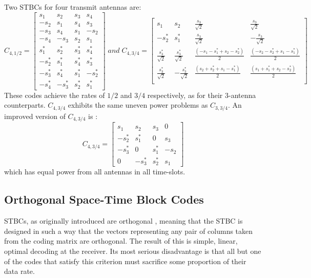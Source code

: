\documentclass{book}
\begin{document}
\begin{itemize}
Two STBCs for four transmit antennas are:
\[
C_{4,1/2}=
\left[\begin{array}{cccc}
s_1 & s_2 & s_3 & s_4\\
-s_2 & s_1 & s_4 & s_3\\
-s_3 & s_4 & s_1 & -s_2\\
-s_4 & -s_3 & s_2 & s_1\\
s^*_1 & s^*_2 & s^*_3 & s^*_4\\
-s^*_2 & s^*_1 & s^*_4 & s^*_3\\
-s^*_3 & s^*_4 & s^*_1 & -s^*_2\\
-s^*_4 & -s^*_3 & s^*_2 & s^*_1
\end{array} \right] \;and\; C_{4,3/4}=\left[\begin{array}{cccc}
s_1 & s_2 & \frac{s_3}{\sqrt{2}} & \frac{s_3}{\sqrt{2}}\\
-s^*_2 & s^*_1 & \frac{s_3}{\sqrt{2}} & -\frac{s_3}{\sqrt{2}}\\
\frac{s^*_3}{\sqrt{2}} & \frac{s^*_3}{\sqrt{2}} & \frac{(-s_1-s^*_1+s_2-s^*_2)}{2} & \frac{(-s_2-s^*_2+s_1-s^*_1)}{2}\\
\frac{s^*_3}{\sqrt{2}} & -\frac{s^*_3}{\sqrt{2}} & \frac{(s_2+s^*_2+s_1-s^*_1)}{2} & \frac{(s_1+s^*_1+s_2-s^*_2)}{2}\\
\end{array} \right]
\]
These codes achieve the rates of $1/2$ and $3/4$ respectively, as for their 3-antenna counterparts. $C_{4,3/4}$ exhibits the same uneven power problems as $C_{3,3/4}$. An improved version of $C_{4,3/4}$ is \cite{19}:
\[
C_{4,3/4}=\left[\begin{array}{cccc}
s_1 & s_2 & s_3 & 0\\
-s^*_2 & s^*_1 & 0 & s_3\\
-s^*_3 & 0 & s^*_1 & -s_2\\
0 & -s^*_3 & s^*_2 & s_1
\end{array} \right]
\]
which has equal power from all antennas in all time-slots.
\end{itemize}
\subsection{Orthogonal Space-Time Block Codes}
STBCs, as originally introduced are orthogonal , meaning that the STBC is designed in such a way that the vectors representing any pair of columns taken from the coding matrix are orthogonal. The result of this is simple, linear, optimal decoding at the receiver. Its most serious disadvantage is that all but one of the codes that satisfy this criterion must sacrifice some proportion of their data rate.
\end{document}
